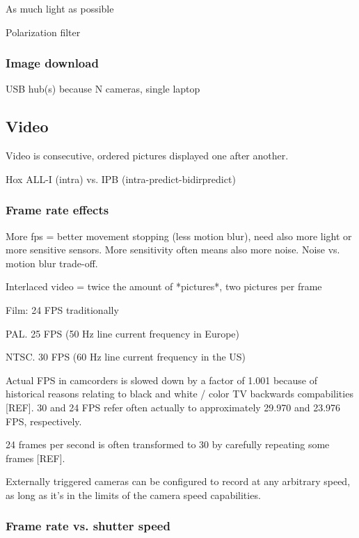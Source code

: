 As much light as possible


Polarization filter

\subsubsection{Image download}

USB hub(s) because N cameras, single laptop

\subsection{Video}

Video is consecutive, ordered pictures displayed one after another.

Hox ALL-I (intra) vs. IPB (intra-predict-bidirpredict)

\subsubsection{Frame rate effects}

More fps = better movement stopping (less motion blur), need also more light or more sensitive sensors. More sensitivity often means also more noise. Noise vs. motion blur trade-off.

Interlaced video = twice the amount of *pictures*, two pictures per frame

Film: 24 FPS traditionally

PAL. 25 FPS (50 Hz line current frequency in Europe)

NTSC. 30 FPS (60 Hz line current frequency in the US)

Actual FPS in camcorders is slowed down by a factor of 1.001 because of historical reasons relating to black and white / color TV backwards compabilities [REF].
30 and 24 FPS refer often actually to approximately 29.970 and 23.976 FPS, respectively.

24 frames per second is often transformed to 30 by carefully repeating some frames [REF].

Externally triggered cameras can be configured to record at any arbitrary speed, as long as it's in the limits of the camera speed capabilities.

\subsubsection{Frame rate vs. shutter speed}


